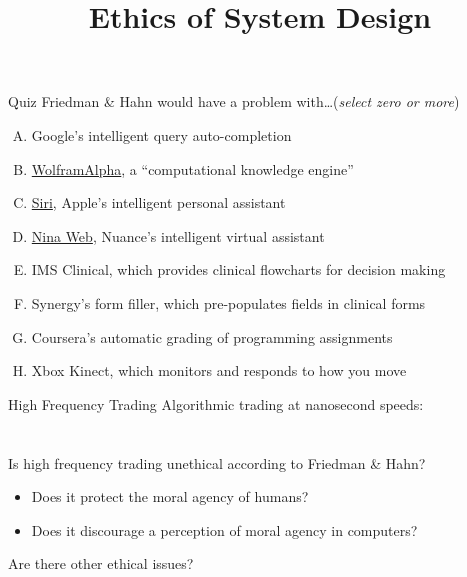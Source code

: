 \documentclass{beamer}
\title{Ethics of System Design}
\date{}
\begin{document}
\begin{frame}
\titlepage
\end{frame}

\begin{frame}{Quiz}
Friedman \& Hahn would have a problem with\ldots \hfill (\emph{select zero or more})
\begin{enumerate}[(A)]
\item<1> Google's intelligent query auto-completion
\item<1-2> \href{http://www.wolframalpha.com/}{WolframAlpha}, a ``computational knowledge engine''
\item<1-2> \href{https://www.youtube.com/watch?v=8ciagGASro0}{Siri}, Apple's intelligent personal assistant
\item<1-2> \href{http://www.youtube.com/watch?v=5Y6DjWw_Td8}{Nina Web}, Nuance's intelligent virtual assistant
\item<1-2> IMS Clinical, which provides clinical flowcharts for decision making
\item<1> Synergy's form filler, which pre-populates fields in clinical forms
\item<1> Coursera's automatic grading of programming assignments
\item<1> Xbox Kinect, which monitors and responds to how you move
\end{enumerate}
\end{frame}

\begin{frame}{High Frequency Trading}
Algorithmic trading at nanosecond speeds: \\
\href{http://thecolbertreport.cc.com/videos/kvs6wn/high-frequency-trading}{} \\
\href{http://thecolbertreport.cc.com/videos/ba8i6j/high-frequency-trading---christopher-steiner}{} \\
\bigskip
Is high frequency trading unethical according to Friedman \& Hahn?
\begin{itemize}
\item Does it protect the moral agency of humans?
\item Does it discourage a perception of moral agency in computers?
\end{itemize}
Are there other ethical issues?
\end{frame}
\end{document}
